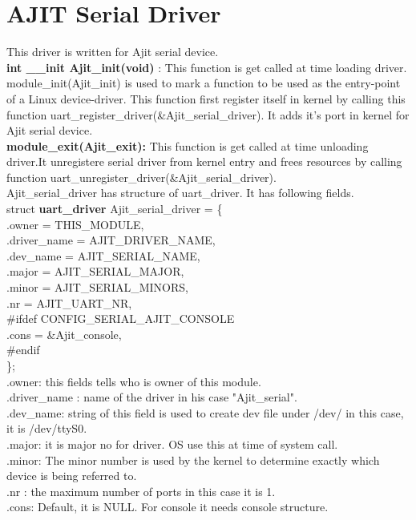 \documentclass[12pt,a4paper]{article}
\begin{document}
\section{AJIT Serial Driver}
This driver is written for Ajit serial device.\\
\textbf{int \_\_init Ajit\_init(void)} :
	This function is get called at time loading driver. module\_init(Ajit\_init) is used to mark a function to be used as the entry-point of a Linux device-driver. This function first register itself in kernel by calling this function uart\_register\_driver(\&Ajit\_serial\_driver). It adds it's port in kernel for Ajit serial device.\\
\textbf{module\_exit(Ajit\_exit):} 	This function is get called at time unloading driver.It unregistere serial driver from kernel entry and frees resources by calling function uart\_unregister\_driver(\&Ajit\_serial\_driver).\\
Ajit\_serial\_driver has structure of uart\_driver. It has following fields.\\ 
struct \textbf{uart\_driver} Ajit\_serial\_driver = \{ \\
	.owner		= THIS\_MODULE,\\
	.driver\_name	= AJIT\_DRIVER\_NAME,\\
	.dev\_name	= AJIT\_SERIAL\_NAME,\\
	.major		= AJIT\_SERIAL\_MAJOR,\\
	.minor		= AJIT\_SERIAL\_MINORS,\\
	.nr		= AJIT\_UART\_NR,\\
\#ifdef CONFIG\_SERIAL\_AJIT\_CONSOLE\\
	.cons		= \&Ajit\_console,\\
\#endif\\
\};\\
.owner: this fields tells who is owner of this module.\\
.driver\_name : name of the driver in his case "Ajit\_serial". \\
.dev\_name: string of this field is used to create dev file under /dev/
in this case, it is /dev/ttyS0.\\
.major: it is major no for driver. OS use this at time of system call.\\
.minor: The minor number is used by the kernel to determine exactly which device is being referred to.\\
.nr : the maximum number of ports in this case it is 1. \\
.cons: Default, it is NULL. For console it needs console structure.
\newpage 
\end{document}

